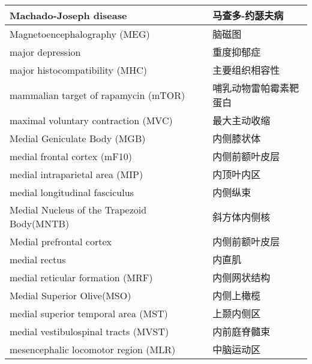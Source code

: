\begin{longtable}{lll}
	\midrule
	Machado-Joseph disease   && 马查多-约瑟夫病  \\
		
	\midrule
	Magnetoencephalography (MEG)   && 脑磁图  \\
	
	\midrule
	major depression   && 重度抑郁症  \\
	
	\midrule
	major histocompatibility (MHC)   && 主要组织相容性  \\
	
	\midrule
	mammalian target of rapamycin (mTOR)   && 哺乳动物雷帕霉素靶蛋白  \\
	
	\midrule
	maximal voluntary contraction (MVC)   && 最大主动收缩  \\
	
	\midrule
	Medial Geniculate Body (MGB)   && 内侧膝状体  \\
	
	\midrule
	medial frontal cortex (mF10)   && 内侧前额叶皮层  \\
	
	\midrule
	medial intraparietal area (MIP)   && 内顶叶内区  \\
	
	\midrule
	medial longitudinal fasciculus   && 内侧纵束  \\
	
	\midrule
	Medial Nucleus of the Trapezoid Body(MNTB)   && 斜方体内侧核  \\
	
	\midrule
	Medial prefrontal cortex    && 内侧前额叶皮层  \\
	
	\midrule
	medial rectus    && 内直肌  \\
	
	\midrule
	medial reticular formation (MRF)    && 内侧网状结构  \\
	
	\midrule
	Medial Superior Olive(MSO)   && 内侧上橄榄  \\
	
	\midrule
	medial superior temporal area (MST)   && 上颞内侧区  \\
	
	\midrule
	medial vestibulospinal tracts (MVST) && 内前庭脊髓束  \\
	
	\midrule
	mesencephalic locomotor region (MLR)   && 中脑运动区  \\
	

\end{longtable}

